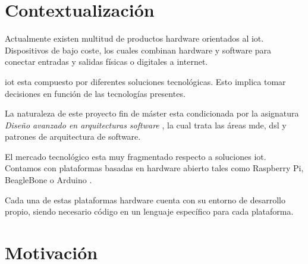 \section{Contextualización}




Actualmente existen multitud de productos hardware orientados al \gls{iot}. Dispositivos de bajo coste, los cuales combinan hardware y software para conectar entradas y salidas físicas o digitales a internet.

\acrshort{iot} esta compuesto por diferentes soluciones tecnológicas. Esto implica tomar decisiones en función de las tecnologías presentes.

La naturaleza de este proyecto fin de máster esta condicionada por la asignatura \textit{Diseño avanzado en arquitecturas software} \cite{udima_diseno_avanzado_arquitecturas_software}, la cual trata las áreas \gls{mde}, \gls{dsl} y patrones de arquitectura de software.


El mercado tecnológico esta muy fragmentado respecto a soluciones \acrshort{iot}. Contamos con plataformas basadas en hardware abierto tales como Raspberry Pi\cite{raspberrypi}, BeagleBone \cite{beaglebone} o Arduino \cite{arduino}.

Cada una de estas plataformas hardware cuenta con su entorno de desarrollo propio, siendo necesario código en un lenguaje específico para cada plataforma.

\section{Motivación}

